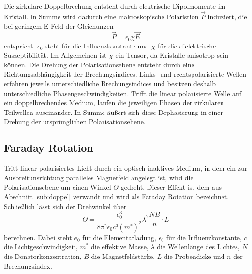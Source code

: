 Die zirkulare Doppelbrechung entsteht durch elektrische Dipolmomente im Kristall.
In Summe wird dadurch eine makroskopische Polaristion $\vec{P}$ induziert, die bei geringem E-Feld der Gleichungen
\begin{equation*}
    \vec{P} = \epsilon_0 \chi \vec{E}
\end{equation*}
entspricht.
$\epsilon_0$ steht für die Influenzkonstante und $\chi$ für die dielektrische Suszeptibilität.
Im Allgemeinen ist $\chi$ ein Tensor, da Kristalle anisotrop sein können.
Die Drehung der Polarisationsebene entsteht durch eine Richtungsabhängigkeit der Brechungsindices. 
Links- und rechtspolarisierte Wellen erfahren jeweils unterschiedliche Brechungsindices und besitzen deshalb unterschiedliche Phasengeschwindigkeiten.
Trifft die linear polarisierte Welle auf ein doppelbrechendes Medium, laufen die jeweiligen Phasen der zirkularen Teilwellen auseinander.
In Summe äußert sich diese Dephasierung in einer Drehung der ursprünglichen Polarisationsebene.


\subsection{Faraday Rotation}
Tritt linear polarisiertes Licht durch ein optisch inaktives Medium, in dem ein zur Ausbreitunsrichtung paralleles Magnetfeld angelegt ist, wird die Polarisationsebene um einen Winkel $\Theta$ gedreht.
Dieser Effekt ist dem aus Abschnitt \ref{sub:doppel} verwandt und wird als Faraday Rotation bezeichnet.
Schließlich lässt sich der Drehwinkel über
\begin{equation}
    \Theta = \frac{e_0^3}{8\pi^2\epsilon_0c^3(m^*)^2}\lambda^2\frac{NB}{n} \cdot L
\end{equation}
berechnen.
Dabei steht $e_0$ für die Elementarladung, $\epsilon_0$ für die Influenzkonstante, $c$ die Lichtgeschwindigkeit,
$m^*$ die effektive Masse, $\lambda$ die Wellenlänge des Lichtes, $N$ die Donatorkonzentration,
$B$ die Magnetfeldstärke, $L$ die Probendicke und $n$ der Brechungsindex.


